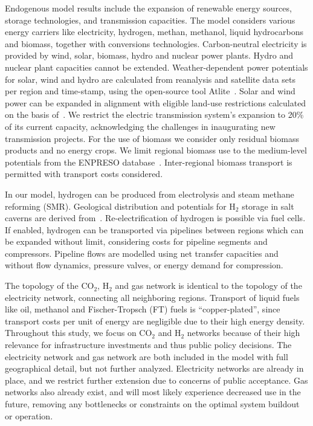 \documentclass[twocolumn]{article}
\newcommand{\COtwo}{CO$_2$}
\newcommand{\Htwo}{H$_2$}
\begin{document}
Endogenous model results include the expansion of renewable energy sources, storage technologies, and transmission capacities.
The model considers various energy carriers like electricity, hydrogen, methan, methanol, liquid hydrocarbons and biomass, together with conversions technologies.
Carbon-neutral electricity is provided by wind, solar, biomass, hydro and nuclear power plants. Hydro and nuclear plant capacities cannot be extended. Weather-dependent power potentials for solar, wind and hydro are calculated from reanalysis and satellite data sets~\cite{hersbachERA5GlobalReanalysis2020,pfeifrothSurfaceRadiationData2017}  per region and time-stamp, using the open-source tool Atlite~\cite{hofmannAtliteLightweightPython2021}.
Solar and wind power can be expanded in alignment with eligible land-use restrictions calculated on the basis of~\cite{eeaCorineLandCover2012,eeaNatura2000Data2016}. We restrict the electric transmission system's expansion to 20\% of its current capacity, acknowledging the challenges in inaugurating new transmission projects.
For the use of biomass we consider only residual biomass products and no energy crops. We limit regional biomass use to the medium-level potentials from the ENPRESO database~\cite{enspreso_database,instituteforenergyandtransportjointresearchcentreJRCEUTIMESModelBioenergy2015}. Inter-regional biomass transport is permitted with transport costs considered.

In our model, hydrogen can be produced from electrolysis and steam methane reforming (SMR). Geological distribution and potentials for \Htwo{} storage in salt caverns are derived from~\cite{caglayanTechnicalPotentialSalt2020}. Re-electrification of hydrogen is possible via fuel cells. If enabled, hydrogen can be transported via pipelines between regions which can be expanded without limit, considering costs for pipeline segments and compressors. Pipeline flows are modelled using net transfer capacities and without flow dynamics, pressure valves, or energy demand for compression.

The topology of the \COtwo{}, \Htwo{} and gas network is identical to the topology of the electricity network, connecting all neighboring regions. Transport of liquid fuels like oil, methanol and Fischer-Tropsch (FT) fuels is ``copper-plated'', since transport costs per unit of energy are negligible due to their high energy density. Throughout this study, we focus on \COtwo{} and \Htwo{} networks because of their high relevance for infrastructure investments and thus public policy decisions. The electricity network and gas network are both included in the model with full geographical detail, but not further analyzed. Electricity networks are already in place, and we restrict further extension due to concerns of public acceptance. Gas networks also already exist, and will most likely experience decreased use in the future, removing any bottlenecks or constraints on the optimal system buildout or operation.
\end{document}
